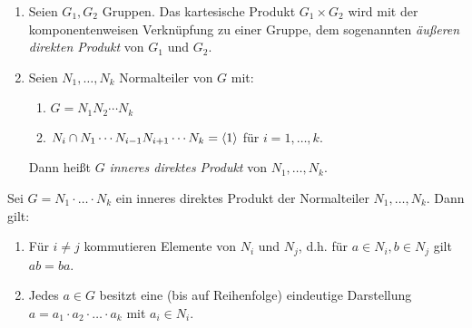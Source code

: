 \begin{definition}\spspace
{}
\begin{enumerate}
 \item Seien $G_1, G_2$ Gruppen. Das kartesische Produkt $G_1 \times G_2$ wird mit der komponentenweisen Verkn\"upfung zu einer Gruppe, dem sogenannten \emph{\"au\ss{}eren direkten Produkt} von $G_1$ und $G_2$.
 \item Seien $N_1,\ldots, N_k$ Normalteiler von $G$ mit:
 \begin{enumerate}
  \item $G=N_1N_2\cdots N_k$
  \item $N_i \cap N_1\cdots N_{i-1}N_{i+1}\cdots N_k = \left<1\right>$ f\"ur $i=1,\ldots, k$.

 \end{enumerate}
 Dann hei\ss{}t $G$ \emph{inneres direktes Produkt} von $N_1,\ldots, N_k$.
\end{enumerate}

 
\end{definition}

\begin{satz}\label{gnlmph}\label{1.10}
 Sei $G=N_1\cdot\ldots\cdot N_k$ ein inneres direktes Produkt der Normalteiler $N_1, \ldots, N_k$. Dann gilt:
 \begin{enumerate}
 \item \label{rt}\label{1.10.1}F\"ur $i\neq j$ kommutieren Elemente von $N_i$ und $N_j$, d.h. f\"ur $a\in N_i, b\in N_j$ gilt $ab=ba$.
 \item Jedes $a\in G$ besitzt eine (bis auf Reihenfolge) eindeutige Darstellung $a=a_1\cdot a_2 \cdot \ldots \cdot a_k$ mit $ a_i\in N_i$.
\end{enumerate}

\end{satz}

